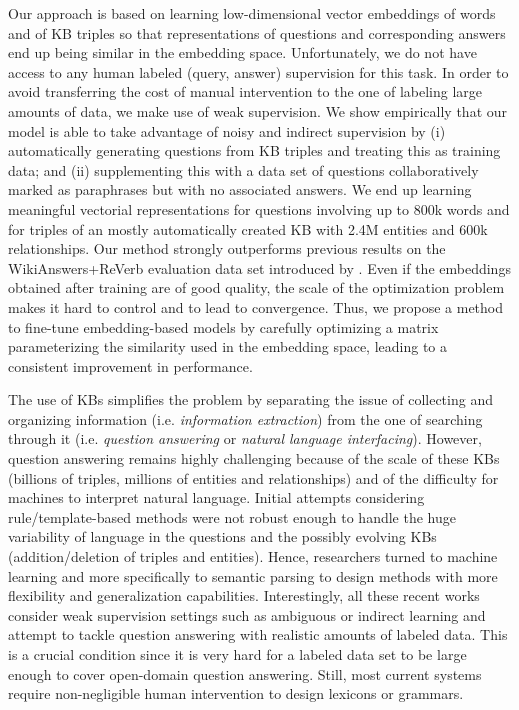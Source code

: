 \documentclass[runningheads,a4paper]{llncs}
\newcommand{\ab}[1]{{\color{black}{#1}}}
\newcommand{\wkrv}{{\sc WikiAnswers+ReVerb}\xspace}
\begin{document}
Our approach is based on learning low-dimensional vector embeddings of words and of KB triples so that representations of questions and corresponding answers end up being similar in the embedding space.
Unfortunately, we do not have access to any human labeled (query, answer) supervision for this task.
In order to avoid transferring the cost of manual intervention to the one of labeling large amounts of data,  we make use of weak supervision.
We show empirically that our model is able to take advantage of noisy and indirect supervision by (i) automatically generating questions from KB triples and treating this as training data; and (ii) supplementing this with a data set of questions collaboratively marked as paraphrases but with no associated answers.
We end up learning meaningful vectorial representations for questions involving up to 800k words and for triples of an mostly automatically created KB with 2.4M entities and 600k relationships. Our method strongly outperforms previous results on the \wkrv evaluation data set introduced by \cite{paralex}.
Even if the embeddings obtained after training are of good quality, the scale of the optimization problem makes it hard to control and to lead to convergence. 
Thus, we propose a method to fine-tune embedding-based models by carefully optimizing a matrix parameterizing the similarity used in the embedding space, leading to  a consistent improvement in performance.

The use of KBs simplifies the problem by separating the issue of collecting and organizing information (i.e. {\it information extraction}) from the one of searching through it (i.e. {\it question answering } or {\it natural language interfacing}).
However, question answering remains highly challenging because of the scale of these KBs (billions of triples, millions of entities and relationships) and of the difficulty for machines to interpret natural language.
Initial attempts considering rule/template-based methods \cite{yahya2012natural,unger2012template} were not robust enough to handle the huge variability of language in the questions and the possibly evolving KBs (addition/deletion of triples and entities).
Hence, researchers turned to machine learning and more specifically to semantic parsing to design methods with more flexibility and generalization capabilities.
Interestingly, all these recent works \cite{cai-yates:2013:ACL2013,berant-EtAl:2013:EMNLP,kwiatkowski-EtAl:2013:EMNLP,paralex}
 consider weak supervision settings such as ambiguous or indirect learning and attempt to tackle question answering with realistic amounts of labeled data.
\ab{Improve the following argument, especially the second sentence, which is a key argument in favor of embedding}
This is a crucial condition since it is very hard for a labeled data set to  be large enough to cover open-domain question answering.
Still, most current systems require non-negligible human intervention to design lexicons or grammars.
\end{document}
